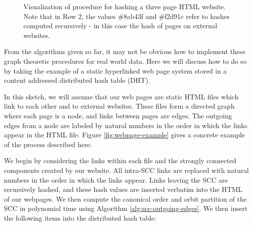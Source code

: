 \documentclass[twoside,leqno]{article}
\begin{document}
\begin{figure}

\caption{Visualization of procedure for hashing a three page HTML website. Note that in Row 2, the values \#8ab43f and \#f2d91c refer to hashes computed recursively - in this case the hash of pages on external websites.}

\end{figure}

From the algorithms given so far, it may not be obvious how to implement these graph theoretic procedures for real world data. Here we will discuss how to do so by taking the example of a static hyperlinked web page system stored in a content addressed distributed hash table (DHT).

In this sketch, we will assume that our web pages are static HTML files which link to each other and to external websites. These files form a directed graph where each page is a node, and links between pages are edges. The outgoing edges from a node are labeled by natural numbers in the order in which the links appear in the HTML file. Figure \ref{fig:webpage-example} gives a concrete example of the process described here.

We begin by considering the links within each file and the strongly connected components created by our website. All intra-SCC links are replaced with natural numbers in the order in which the links appear. Links leaving the SCC are recursively hashed, and these hash values are inserted verbatim into the HTML of our webpages. We then compute the canonical order and orbit partition of the SCC in polynomial time using Algorithm \ref{alg:scc-outgoing-edges}. We then insert the following items into the distributed hash table:
\end{document}
